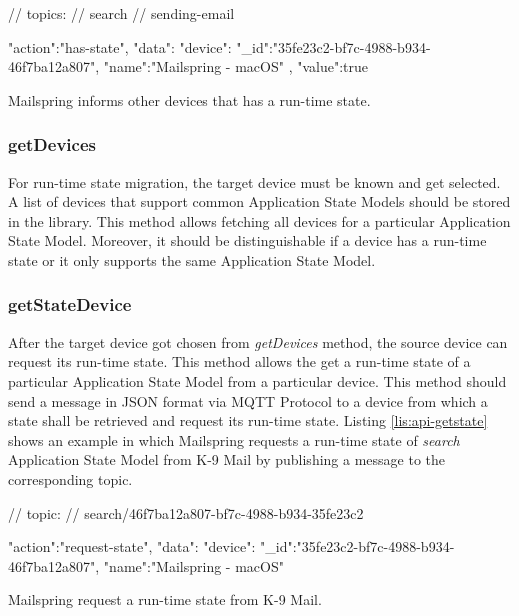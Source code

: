 \FloatBarrier
\begin{code}
\begin{js2}
// topics:
// search
// sending-email
\end{js2}

\begin{json}
{
   "action":"has-state",
   "data":{
      "device":{
         "_id":"35fe23c2-bf7c-4988-b934-46f7ba12a807",
         "name":"Mailspring - macOS"
      },
      "value":true
   }
}
\end{json}
\caption{Mailspring informs other devices that has a run-time state.}
\label{lis:api-sethasstate}
\end{code}
\FloatBarrier


\subsubsection{getDevices}
For run-time state migration, the target device must be known and get selected. A list of devices that support common Application State Models should be stored in the library. This method allows fetching all devices for a particular Application State Model. Moreover, it should be distinguishable if a device has a run-time state or it only supports the same Application State Model.

\subsubsection{getStateDevice}
After the target device got chosen from \textit{getDevices} method, the source device can request its run-time state. This method allows the get a run-time state of a particular Application State Model from a particular device. This method should send a message in JSON format via MQTT Protocol to a device from which a state shall be retrieved and request its run-time state. Listing \ref{lis:api-getstate} shows an example in which Mailspring requests a run-time state of \textit{search} Application State Model from K-9 Mail by publishing a message to the corresponding topic.

\FloatBarrier
\begin{code}
\begin{js2}
// topic:
// search/46f7ba12a807-bf7c-4988-b934-35fe23c2
\end{js2}

\begin{json}
{
   "action":"request-state",
   "data":{
      "device":{
         "_id":"35fe23c2-bf7c-4988-b934-46f7ba12a807",
         "name":"Mailspring - macOS"
      }
   }
}
\end{json}
\caption{Mailspring request a run-time state from K-9 Mail.}
\label{lis:api-getstate}
\end{code}
\FloatBarrier


